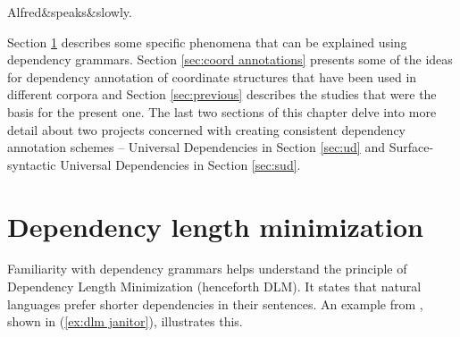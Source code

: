 \begin{exe}
    \ex
    \label{ex:tesniere today}
    \begin{dependency}[theme = simple, baseline=-\the\dimexpr\fontdimen22\textfont2\relax]
    \begin{deptext}
        Alfred\&speaks\&slowly.\\
    \end{deptext}
    \end{dependency}
\end{exe} 

Section \ref{sec:dlm} describes some specific phenomena that can be explained using dependency grammars. Section \ref{sec:coord annotations} presents some of the ideas for dependency annotation of coordinate structures that have been used in different corpora and Section \ref{sec:previous} describes the studies that were the basis for the present one. The last two sections of this chapter delve into more detail about two projects concerned with creating consistent dependency annotation schemes -- Universal Dependencies in Section \ref{sec:ud} and Surface-syntactic Universal Dependencies in Section \ref{sec:sud}. 

\section{Dependency length minimization}\label{sec:dlm}
Familiarity with dependency grammars helps understand the principle of Dependency Length Minimization (henceforth DLM). It states that natural languages prefer shorter dependencies in their sentences. An example from \cite{hp83}, shown in (\ref{ex:dlm janitor}), illustrates this.

